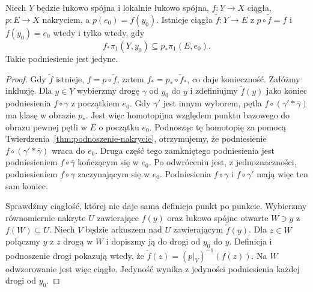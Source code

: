 \begin{twierdzenie}
\label{thm:kryterium-podnoszenia}
Niech $Y$ będzie łukowo spójna i lokalnie
łukowo spójna, $f:Y\to X$ ciągła,
$p:E\to X$ nakryciem, a $p(e_0)=f(y_0)$.
Istnieje ciągła $\widetilde f:Y\to E$
z $p\circ\widetilde f=f$ i
$\widetilde f(y_0)=e_0$ wtedy i tylko wtedy, gdy
\[
 f_*\pi_1(Y,y_0)\subseteq
 p_*\pi_1(E,e_0).
\]
Takie podniesienie jest jedyne.
\end{twierdzenie}
\begin{proof}
Gdy $\widetilde f$ istnieje,
$f=p\circ\widetilde f$, zatem
$f_*=p_*\circ\widetilde f_*$, co daje konieczność.
Załóżmy inkluzję. Dla $y\in Y$ wybierzmy
drogę $\gamma$ od $y_0$ do $y$ i
zdefiniujmy $\widetilde f(y)$ jako koniec
podniesienia $f\circ\gamma$ z początkiem $e_0$.
Gdy $\gamma'$ jest innym wyborem,
pętla $f\circ(\gamma'*\bar\gamma)$
ma klasę w obrazie $p_*$. Jest więc
homotopijna względem punktu bazowego
do obrazu pewnej pętli w $E$ o początku
$e_0$. Podnosząc tę homotopię za pomocą
Twierdzenia~\ref{thm:podnoszenie-nakrycie},
otrzymujemy, że podniesienie
$f\circ(\gamma'*\bar\gamma)$ wraca do $e_0$.
Druga część tego zamkniętego podniesienia jest podniesieniem
$f\circ\bar\gamma$ kończącym się w $e_0$.
Po odwróceniu jest, z jednoznaczności, podniesieniem
$f\circ\gamma$ zaczynającym się w $e_0$.
Podniesienia $f\circ\gamma$ i $f\circ\gamma'$ mają więc ten sam koniec.

Sprawdźmy ciągłość, której nie daje sama
definicja punkt po punkcie. Wybierzmy
równomiernie nakryte $U$ zawierające $f(y)$
oraz łukowo spójne otwarte $W\ni y$ z
$f(W)\subseteq U$. Niech $V$ będzie
arkuszem nad $U$ zawierającym $\widetilde f(y)$.
Dla $z\in W$ połączmy $y$ z $z$ drogą
w $W$ i dopiszmy ją do drogi od $y_0$
do $y$. Definicja i podnoszenie drogi
pokazują wtedy, że
$\widetilde f(z)=(p|_V)^{-1}(f(z))$.
Na $W$ odwzorowanie jest więc ciągłe.
Jedyność wynika z jedyności podniesienia
każdej drogi od $y_0$.
\end{proof}

